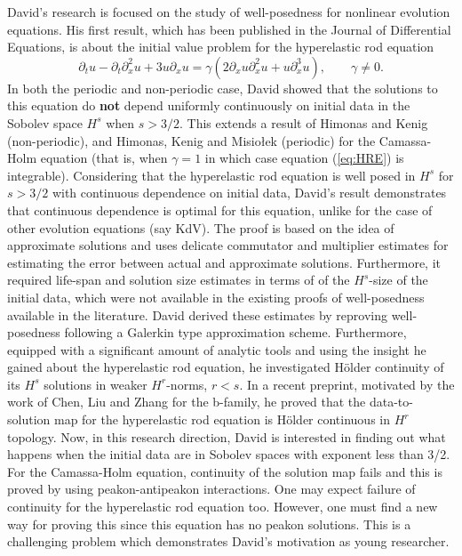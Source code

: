 David's  research is focused on the study of well-posedness for nonlinear 
evolution equations. His  first result, which has been  published in 
the Journal of Differential Equations, 
 is about the initial value problem for 
the hyperelastic rod equation 
%
\begin{equation}
\label{eq:HRE}
\partial_t u-\partial_t\partial_x^2u+3u\partial_x u=\gamma\left(2\partial_x u\partial_x^2 u+u\partial_x^3 u\right),
\qquad  \gamma\neq 0.
\end{equation}
%
In both the periodic and non-periodic case,
David   showed that the solutions to this equation do {\bf not} depend uniformly continuously on initial data in the  Sobolev space $H^s$ when $s>3/2$.
This extends a result  of  Himonas and Kenig (non-periodic),
and Himonas, Kenig and  Misio\l ek (periodic)  for   the Camassa-Holm 
equation (that is,   when  $\gamma = 1$ in which case  equation (\ref{eq:HRE}) is integrable).
Considering  that  the  hyperelastic rod equation  is well posed 
in $H^s$ for $s>3/2$   with continuous dependence on initial data,
David's result demonstrates that continuous dependence
is optimal  for this equation, unlike for the case of other 
evolution equations (say KdV).
The proof  is based on the idea of approximate solutions 
and  uses  delicate commutator and multiplier estimates
for estimating the error between actual and approximate
solutions. Furthermore, it required  life-span and solution size 
estimates in terms of of the $H^s$-size of the initial data,
which  were not available in the existing proofs 
of well-posedness available in the literature.
David derived these  estimates by reproving well-posedness 
following a Galerkin type approximation scheme.
Furthermore, equipped with a  significant amount of analytic tools 
and  using the insight he gained about the hyperelastic rod equation, 
he investigated H\"older continuity of its $H^s$ solutions
in  weaker  $H^r$-norms, $r<s$. 
In a recent preprint, motivated by the work of  Chen,  Liu and Zhang
for the b-family, he proved that the data-to-solution map for  the hyperelastic rod equation 
is  H\"older continuous in $H^r$ topology.
Now, in this research  direction,  David is interested in finding out
what happens  when the initial data are in Sobolev spaces 
with exponent less than 3/2.  For the Camassa-Holm equation,
 continuity of the solution map fails and this is proved by 
 using peakon-antipeakon interactions.
 One may expect  failure of continuity for 
 the hyperelastic rod equation too.
  However, one must find a new way for proving this since
this equation has no peakon solutions.
This is a challenging problem which demonstrates David's
motivation as  young researcher.

